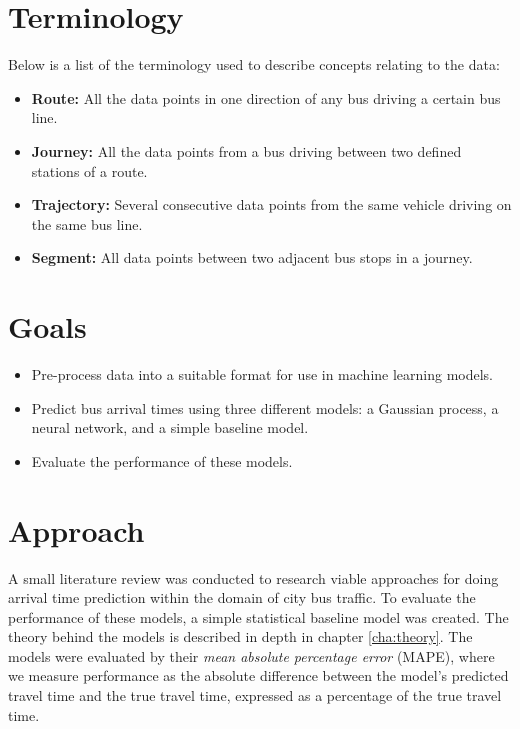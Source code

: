 \section{Terminology}
\label{sec:terminology}
Below is a list of the terminology used to describe concepts relating to the data:
\begin{itemize}
\item \textbf{Route:} All the data points in one direction of any bus driving a certain bus line.
\item \textbf{Journey:} All the data points from a bus driving between two defined stations of a route.
\item \textbf{Trajectory:} Several consecutive data points from the same vehicle driving on the same bus line.
\item \textbf{Segment:} All data points between two adjacent bus stops in a journey.
\\
\end{itemize}

\section{Goals}
\label{sec:aim}

\begin{itemize}[]
  \item Pre-process data into a suitable format for use in machine learning models.
  \item Predict bus arrival times using three different models: a Gaussian process, a neural network, and a simple baseline model.
  \item Evaluate the performance of these models.
\end{itemize}

\section{Approach}
\label{sec:research-questions}

A small literature review was conducted to research viable approaches for doing arrival time prediction within the domain of city bus traffic. To evaluate the performance of these models, a simple statistical baseline model was created. The theory behind the models is described in depth in chapter \ref{cha:theory}. The models were evaluated by their \textit{mean absolute percentage error} (MAPE), where we measure performance as the absolute difference between the model's predicted travel time and the true travel time, expressed as a percentage of the true travel time. 

